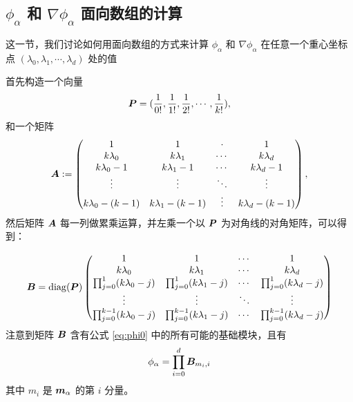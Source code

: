 \documentclass{article}
\begin{document}
\subsection{$\phi_\alpha$ 和 $\nabla \phi_\alpha$ 面向数组的计算}

这一节，我们讨论如何用面向数组的方式来计算 $\phi_\alpha$ 和 $\nabla \phi_\alpha$
在任意一个重心坐标点 $(\lambda_0, \lambda_1, \cdots, \lambda_d)$ 处的值

首先构造一个向量
\begin{equation*}
    {\boldsymbol P} = (\frac{1}{0!}, \frac{1}{1!}, \frac{1}{2!}, \cdots, \frac{1}{k!}),
\end{equation*}
和一个矩阵
\begin{equation}\label{eq:A}
{\boldsymbol A} :=                                                                            
\begin{pmatrix}  
1  &  1  & \cdot & 1 \\
k\lambda_0 & k\lambda_1 & \cdots & k\lambda_d\\                                             
k\lambda_0 - 1 & k\lambda_1 - 1 & \cdots & k\lambda_d - 1\\   
\vdots & \vdots & \ddots & \vdots \\                                                     
k\lambda_0 - (k - 1) & k\lambda_1 - (k - 1) & \vdots & k\lambda_d - (k - 1)
\end{pmatrix},
\end{equation}
然后矩阵 ${\boldsymbol A}$ 每一列做累乘运算，并左乘一个以 ${\boldsymbol P}$ 为对角线的对角矩阵，可以得
到：

\begin{equation}\label{eq:B}
{\boldsymbol B} = \mathrm{diag}({\boldsymbol P})
\begin{pmatrix}
1 & 1 & \cdots & 1 \\
k\lambda_0 & k\lambda_1 & \cdots & k\lambda_d\\
\prod_{j=0}^{1}(k\lambda_0 - j) & \prod_{j=0}^{1}(k\lambda_1 - j)
& \cdots & \prod_{j=0}^{1}(k\lambda_d - j) \\
\vdots & \vdots & \ddots & \vdots \\
\prod_{j=0}^{k-1}(k\lambda_0 - j) & \prod_{j=0}^{k-1}(k\lambda_1 - j) & \cdots & \prod_{j=0}^{k-1}(k\lambda_d - j) 
\end{pmatrix}
\end{equation}
注意到矩阵 ${\boldsymbol B}$ 含有公式 \eqref{eq:phi0} 中的所有可能的基础模块，且有 
\begin{equation*}
    \phi_\alpha = \prod_{i=0}^d{\boldsymbol B}_{m_i, i}
\end{equation*}
其中 $m_i$ 是 ${\boldsymbol m}_\alpha$ 的第 $i$ 分量。
\end{document}
